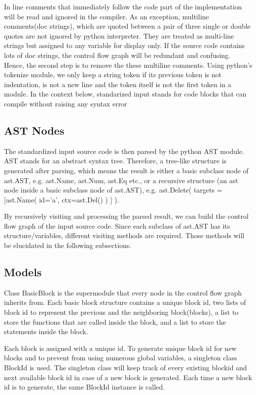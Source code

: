 \documentclass[11pt]{article}
\begin{document}
In line comments that immediately follow the code part of the implementation will be read and ignored in the compiler. As an exception, multiline comments(doc strings), which are quoted between a pair of three single or double quotes are not ignored by python interpreter. They are treated as multi-line strings but assigned to any variable for display only. If the source code contains lots of doc strings, the control flow graph will be redundant and confusing. \\
Hence, the second step is to remove the these multiline comments. Using python's tokenize module, we only keep a string token if its previous token is not indentation, is not a new line and the token itself is not the first token in a module. In the context below, standarized input stands for code blocks that can compile without raising any syntax error

\subsection{AST Nodes}
The standardized input source code is then parsed by the python AST module. AST stands for an abstract syntax tree. Therefore, a tree-like structure is generated after parsing, which means the result is either a basic subclass node of ast.AST, e.g. ast.Name, ast.Num, ast.Eq etc., or a recursive structure (an ast node inside a basic subclass node of ast.AST), e.g. ast.Delete( targets = [ast.Name( id='a', ctx=ast.Del() ) ] ).

By recursively visiting and processing the parsed result, we can build the control flow graph of the input source code. Since each subclass of ast.AST has its structure/variables, different visiting methods are required. Those methods will be elucidated in the following subsections.

\subsection{Models}
Class BasicBlock is the supermodule that every node in the control flow graph inherits from. Each basic block structure contains a unique block id, two lists of block id to represent the previous and the neighboring block(blocks), a list to store the functions that are called inside the block, and a list to store the statements inside the block.

Each block is assigned with a unique id. To generate unique block id for new blocks and to prevent from using numerous global variables, a singleton class BlockId is used. The singleton class will keep track of every existing blockid and next available block id in case of a new block is generated. Each time a new block id is to generate, the same BlockId instance is called.
\end{document}
